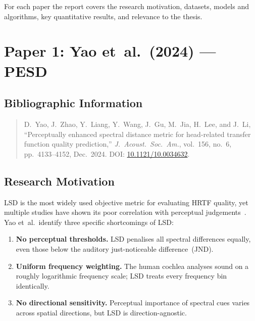 \documentclass[12pt,a4paper]{article}
\begin{document}
For each paper the report covers the research motivation, datasets, models and
algorithms, key quantitative results, and relevance to the thesis.


\newpage
\section{Paper 1: Yao et~al.\ (2024) --- PESD}

\subsection{Bibliographic Information}

\begin{quote}
D.~Yao, J.~Zhao, Y.~Liang, Y.~Wang, J.~Gu, M.~Jia, H.~Lee, and J.~Li,
``Perceptually enhanced spectral distance metric for head-related transfer
function quality prediction,''
\textit{J.\ Acoust.\ Soc.\ Am.}, vol.~156, no.~6, pp.~4133--4152, Dec.~2024.
DOI: \href{https://doi.org/10.1121/10.0034632}{10.1121/10.0034632}.
\end{quote}

\subsection{Research Motivation}

LSD is the most widely used objective metric for evaluating HRTF quality,
yet multiple studies have shown its poor correlation with perceptual
judgements~\cite{doma2023, ananthabhotla2021}.  Yao et~al.\ identify three
specific shortcomings of LSD:

\begin{enumerate}
  \item \textbf{No perceptual thresholds.}  LSD penalises all spectral
        differences equally, even those below the auditory
        just-noticeable difference~(JND).
  \item \textbf{Uniform frequency weighting.}  The human cochlea analyses
        sound on a roughly logarithmic frequency scale; LSD treats every
        frequency bin identically.
  \item \textbf{No directional sensitivity.}  Perceptual importance of
        spectral cues varies across spatial directions, but LSD is
        direction-agnostic.
\end{enumerate}
\end{document}
